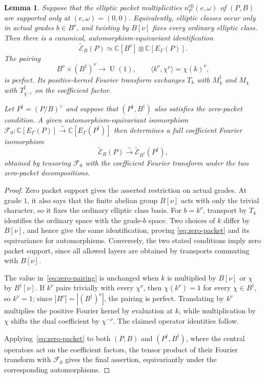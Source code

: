 \documentclass[11pt,a4paper,reqno]{amsart}
\theoremstyle{plain}
\newtheorem{lemma}[theorem]{Lemma}
\theoremstyle{definition}
\theoremstyle{remark}
\numberwithin{equation}{section}
\newcommand{\UU}{\operatorname{U}}
\newcommand{\CC}{\mathbb C}
\newcommand{\wtE}{\widetilde{\mathcal E}}
\newcommand{\pair}[2]{\langle #1,#2\rangle}
\begin{document}
\begin{lemma}\label{lem:zero-packet}
Suppose that the elliptic packet multiplicities $n_P^{\mathrm{ell}}(e,\omega)$ of $(P,B)$ are supported only at $(e,\omega)=(0,0)$. Equivalently, elliptic classes occur only in actual grades $b\in B^\nu$, and twisting by $B[\nu]$ fixes every ordinary elliptic class. Then there is a canonical, automorphism-equivariant identification
\begin{equation}\label{eq:zero-packet}
\wtE_B(P)\simeq\CC[B^\nu]\otimes\CC[E_\Gamma(P)].
\end{equation}
The pairing
\begin{equation}\label{eq:zero-pairing}
B^\nu\times(B^\dagger)^\nu\longrightarrow\UU(1),\qquad
\pair{k^\nu}{\chi^\nu}=\chi(k)^\nu,
\end{equation}
is perfect. Its positive-kernel Fourier transform exchanges $T_k$ with $M_k^\dagger$ and $M_\chi$ with $T_{\chi^{-1}}^\dagger$ on the coefficient factor.

Let $P^\dagger=(P/B)^\vee$ and suppose that $(P^\dagger,B^\dagger)$ also satisfies the zero-packet condition. A given automorphism-equivariant isomorphism $\mathcal F_0\colon\CC[E_\Gamma(P)]\xrightarrow{\sim}\CC[E_\Gamma(P^\dagger)]$ then determines a full coefficient Fourier isomorphism
\[
\wtE_B(P)\xrightarrow{\sim}\wtE_{B^\dagger}(P^\dagger),
\]
obtained by tensoring $\mathcal F_0$ with the coefficient Fourier transform under the two zero-packet decompositions.
\end{lemma}
\begin{proof}
Zero packet support gives the asserted restriction on actual grades. At grade $1$, it also says that the finite abelian group $B[\nu]$ acts with only the trivial character, so it fixes the ordinary elliptic class basis. For $b=k^\nu$, transport by $T_k$ identifies the ordinary space with the grade-$b$ space. Two choices of $k$ differ by $B[\nu]$, and hence give the same identification, proving \eqref{eq:zero-packet} and its equivariance for automorphisms. Conversely, the two stated conditions imply zero packet support, since all allowed layers are obtained by transports commuting with $B[\nu]$.

The value in~\eqref{eq:zero-pairing} is unchanged when $k$ is multiplied by $B[\nu]$ or $\chi$ by $B^\dagger[\nu]$. If $k^\nu$ pairs trivially with every $\chi^\nu$, then $\chi(k^\nu)=1$ for every $\chi\in B^\dagger$, so $k^\nu=1$; since $|B^\nu|=|(B^\dagger)^\nu|$, the pairing is perfect. Translating by $k^\nu$ multiplies the positive Fourier kernel by evaluation at $k$, while multiplication by $\chi$ shifts the dual coefficient by $\chi^{-\nu}$. The claimed operator identities follow.

Applying~\eqref{eq:zero-packet} to both $(P,B)$ and $(P^\dagger,B^\dagger)$, where the central operators act on the coefficient factors, the tensor product of their Fourier transform with $\mathcal F_0$ gives the final assertion, equivariantly under the corresponding automorphisms.
\end{proof}
\end{document}

